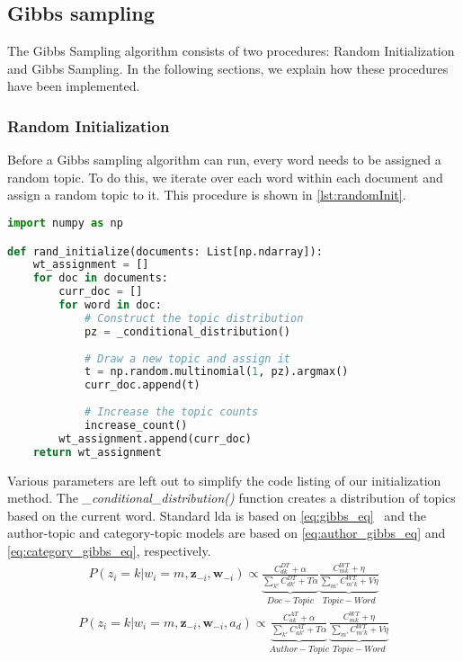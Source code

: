 \subsection{Gibbs sampling}\label{sec:appendix_gibbs}
The Gibbs Sampling algorithm consists of two procedures: Random Initialization and Gibbs Sampling.
In the following sections, we explain how these procedures have been implemented.

\subsubsection{Random Initialization}
Before a Gibbs sampling algorithm can run, every word needs to be assigned a random topic.
To do this, we iterate over each word within each document and assign a random topic to it.
This procedure is shown in \autoref{lst:randomInit}.
\begin{lstlisting}[language=Python, caption=Random Initialization,label={lst:randomInit}, float, floatplacement=H]
import numpy as np

def rand_initialize(documents: List[np.ndarray]):
	wt_assignment = []
	for doc in documents:
		curr_doc = []
		for word in doc:
			# Construct the topic distribution
			pz = _conditional_distribution()
			
			# Draw a new topic and assign it
			t = np.random.multinomial(1, pz).argmax()
			curr_doc.append(t)
			
			# Increase the topic counts
			increase_count()
		wt_assignment.append(curr_doc)
	return wt_assignment
\end{lstlisting}
Various parameters are left out to simplify the code listing of our initialization method.
The \emph{\_conditional\_distribution()} function creates a distribution of topics based on the current word.
Standard \gls{lda} is based on \autoref{eq:gibbs_eq}~\cite{author_topic_2012} and the author-topic and category-topic models are based on \autoref{eq:author_gibbs_eq} and \autoref{eq:category_gibbs_eq}, respectively.
\begin{equation}\label{eq:gibbs_eq}
	\begin{split}
		P(z_i = k|w_i = m, \boldsymbol{z}_{-i}, \boldsymbol{w}_{-i}) \propto 
		\underbrace{\frac{C^{DT}_{dk} + \alpha}{\sum_{k'} C^{DT}_{dk'} + T\alpha}}_{Doc-Topic}
		\underbrace{\frac{C^{WT}_{mk} + \eta}{\sum_{m'} C^{WT}_{m'k} + V\eta}}_{Topic-Word}
	\end{split}
\end{equation}
\begin{equation}\label{eq:author_gibbs_eq}
	\begin{split}
		P(z_i = k|w_i = m, \boldsymbol{z}_{-i}, \boldsymbol{w}_{-i}, a_d) \propto 
		\underbrace{\frac{C^{AT}_{ak} + \alpha}{\sum_{k'} C^{AT}_{ak'} + T\alpha}}_{Author-Topic}
		\underbrace{\frac{C^{WT}_{mk} + \eta}{\sum_{m'} C^{WT}_{m'k} + V\eta}}_{Topic-Word}
	\end{split}
\end{equation}
